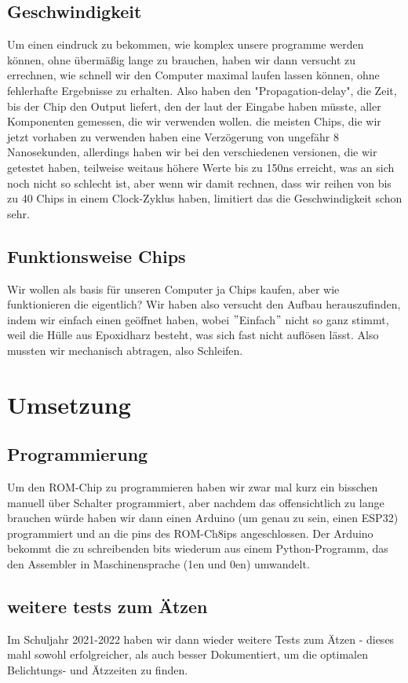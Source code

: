 \documentclass{scrartcl}
\begin{document}
    \subsection{Geschwindigkeit}
    Um einen eindruck zu bekommen, wie komplex unsere programme werden können, ohne übermäßig lange zu brauchen, haben wir dann versucht zu errechnen, wie schnell wir den Computer maximal laufen lassen können, ohne fehlerhafte Ergebnisse zu erhalten.
    Also haben den "Propagation-delay", die Zeit, bis der Chip den Output liefert, den der laut der Eingabe haben müsste, aller Komponenten gemessen, die wir verwenden wollen.
    die meisten Chips, die wir jetzt vorhaben zu verwenden haben eine Verzögerung von ungefähr 8 Nanosekunden, allerdings haben wir bei den verschiedenen versionen, die wir getestet haben, teilweise weitaus höhere Werte bis zu 150ns erreicht, was an sich noch nicht so schlecht ist, aber wenn wir damit rechnen, dass wir reihen von bis zu 40 Chips in einem Clock-Zyklus haben, limitiert das die Geschwindigkeit schon sehr.

    \subsection{Funktionsweise Chips}
    Wir wollen als basis für unseren Computer ja Chips kaufen, aber wie funktionieren die eigentlich?
    Wir haben also versucht den Aufbau herauszufinden, indem wir einfach einen geöffnet haben, wobei $"$Einfach$"$ nicht so ganz stimmt, weil die Hülle aus Epoxidharz besteht, was sich fast nicht auflösen lässt.
    Also mussten wir mechanisch abtragen, also Schleifen.

    \section{Umsetzung}
    \subsection{Programmierung}
    Um den ROM-Chip zu programmieren haben wir zwar mal kurz ein bisschen manuell über Schalter programmiert, aber nachdem das offensichtlich zu lange brauchen würde haben wir dann einen Arduino (um genau zu sein, einen ESP32) programmiert und an die pins des ROM-Ch8ips angeschlossen.
    Der Arduino bekommt die zu schreibenden bits wiederum aus einem Python-Programm, das den Assembler in Maschinensprache (1en und 0en) umwandelt.

    \subsection{weitere tests zum Ätzen}
    Im Schuljahr 2021-2022 haben wir dann wieder weitere Tests zum Ätzen - dieses mahl sowohl erfolgreicher, als auch besser Dokumentiert, um die optimalen Belichtungs- und Ätzzeiten zu finden.
\end{document}
